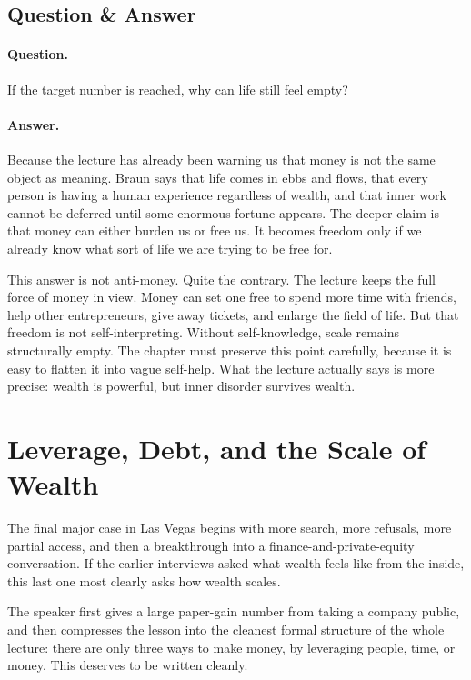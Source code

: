 \subsection{Question \& Answer}

\paragraph{Question.} If the target number is reached, why can life still feel empty?

\paragraph{Answer.} Because the lecture has already been warning us that money is not the same object as meaning. Braun says that life comes in ebbs and flows, that every person is having a human experience regardless of wealth, and that inner work cannot be deferred until some enormous fortune appears. The deeper claim is that money can either burden us or free us. It becomes freedom only if we already know what sort of life we are trying to be free for.

This answer is not anti-money. Quite the contrary. The lecture keeps the full force of money in view. Money can set one free to spend more time with friends, help other entrepreneurs, give away tickets, and enlarge the field of life. But that freedom is not self-interpreting. Without self-knowledge, scale remains structurally empty. The chapter must preserve this point carefully, because it is easy to flatten it into vague self-help. What the lecture actually says is more precise: wealth is powerful, but inner disorder survives wealth.

\section{Leverage, Debt, and the Scale of Wealth}

The final major case in Las Vegas begins with more search, more refusals, more partial access, and then a breakthrough into a finance-and-private-equity conversation. If the earlier interviews asked what wealth feels like from the inside, this last one most clearly asks how wealth scales.

The speaker first gives a large paper-gain number from taking a company public, and then compresses the lesson into the cleanest formal structure of the whole lecture: there are only three ways to make money, by leveraging people, time, or money. This deserves to be written cleanly.

